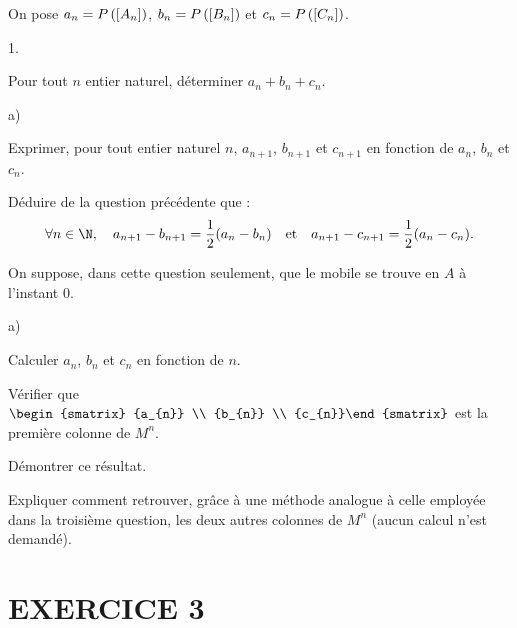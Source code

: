 \documentclass[11pt]{article}%
\begin{document}
On pose $a_{n} = P\left(\left[ {A_{n}} \right]\right)$, $b_{n} =
P\left(\left[ {B_{n}} \right]\right)$ et $c_{n} = P\left(\left[ {C_{n}} \right]\right)$.

\begin{noliste}{1.}
 \setlength{\itemsep}{4mm}
\item Pour tout $n$ entier naturel, déterminer $a_{n} + b_{n} + c_{n}$.

\item 

\begin{noliste}{a)}
 \setlength{\itemsep}{2mm}
\item Exprimer, pour tout entier naturel $n$, $a_{n + 1}$, $b_{n + 1}$
et $c_{n + 1}$ en fonction de $a_{n}$, $b_{n}$ et $c_{n}$.

\item Déduire de la question précédente que : 
\[
\forall n\in \N,\quad a_{n + 1}-b_{n + 1} =
\dfrac{{1}}{{2}}(a_{n}-b_{n})\quad \text{et}\quad a_{n + 1}-c_{n + 1} =
\dfrac{{1}}{{2}}(a_{n}-c_{n}).
\]
\end{noliste}

\item On suppose, dans cette question seulement, que le mobile se
trouve en $A$ à l'instant 0.

\begin{noliste}{a)}
 \setlength{\itemsep}{2mm}
\item Calculer $a_{n}$, $b_{n}$ et $c_{n}$ en fonction de $n$.

\item Vérifier que ${{\begin{smatrix}
{a_{n}} \\
{b_{n}} \\
{c_{n}}\end{smatrix}
}}$ est la première colonne de $M^{n}$.

\item Démontrer ce résultat.
\end{noliste}

\item Expliquer comment retrouver, grâce à une méthode analogue à celle
employée dans la troisième question, les deux autres colonnes de
$M^{n}$
(aucun calcul n'est demandé).
\end{noliste}

\section*{EXERCICE 3}
\end{document}
